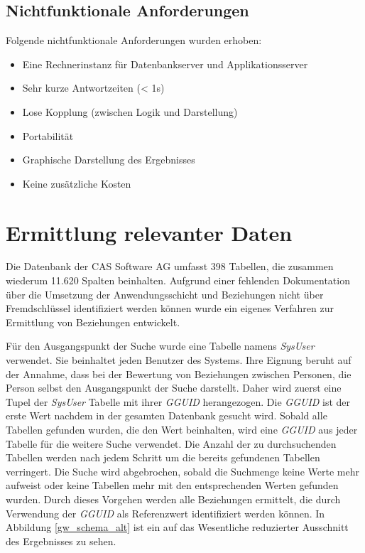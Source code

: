 \subsection{Nichtfunktionale Anforderungen}

Folgende nichtfunktionale Anforderungen wurden erhoben:

\begin{itemize}
	
	\item Eine Rechnerinstanz für Datenbankserver und Applikationsserver 
	
	\item Sehr kurze Antwortzeiten (< 1s)
	
	\item Lose Kopplung (zwischen Logik und Darstellung)
	
	\item Portabilität
	
	\item Graphische Darstellung des Ergebnisses
	
	\item Keine zusätzliche Kosten

\end{itemize}

\section{Ermittlung relevanter Daten}
\label{ch:Systemanalyse:sec:Information}

Die Datenbank der CAS Software AG umfasst 398 Tabellen, die zusammen wiederum 11.620 Spalten beinhalten. Aufgrund einer fehlenden Dokumentation über die Umsetzung der Anwendungsschicht und Beziehungen nicht über Fremdschlüssel identifiziert werden können wurde ein eigenes Verfahren zur Ermittlung von Beziehungen entwickelt. 

Für den Ausgangspunkt der Suche wurde eine Tabelle namens \textit{SysUser} verwendet. Sie beinhaltet jeden Benutzer des Systems. Ihre Eignung beruht auf der Annahme, dass bei der Bewertung von Beziehungen zwischen Personen, die Person selbst den Ausgangspunkt der Suche darstellt. Daher wird zuerst eine Tupel der \textit{SysUser} Tabelle mit ihrer \textit{GGUID} herangezogen. Die \textit{GGUID} ist der erste Wert nachdem in der gesamten Datenbank gesucht wird. Sobald alle Tabellen gefunden wurden, die den Wert beinhalten, wird eine \textit{GGUID} aus jeder Tabelle für die weitere Suche verwendet. Die Anzahl der zu durchsuchenden Tabellen werden nach jedem Schritt um die bereits gefundenen Tabellen verringert. Die Suche wird abgebrochen, sobald die Suchmenge keine Werte mehr aufweist oder keine Tabellen mehr mit den entsprechenden Werten gefunden wurden. Durch dieses Vorgehen werden alle Beziehungen ermittelt, die durch Verwendung der \textit{GGUID} als Referenzwert identifiziert werden können. In Abbildung \ref{gw_schema_alt} ist ein auf das Wesentliche reduzierter Ausschnitt des Ergebnisses zu sehen. 

